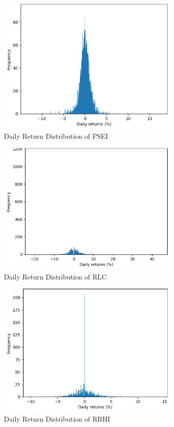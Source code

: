 \begin{figure}[ht]
    \centering
    \includegraphics[width=0.80\textwidth]{./assets/Appendices/B/Distribution_DailyReturns/PSEI.png}
    \caption{Daily Return Distribution of PSEI}
    \label{fig:returndist_PSEI}
\end{figure}
\FloatBarrier

\begin{figure}[ht]
    \centering
    \includegraphics[width=0.80\textwidth]{./assets/Appendices/B/Distribution_DailyReturns/RLC.png}
    \caption{Daily Return Distribution of RLC}
    \label{fig:returndist_RLC}
\end{figure}
\FloatBarrier

\begin{figure}[ht]
    \centering
    \includegraphics[width=0.80\textwidth]{./assets/Appendices/B/Distribution_DailyReturns/RRHI.png}
    \caption{Daily Return Distribution of RRHI}
    \label{fig:returndist_RRHI}
\end{figure}
\FloatBarrier

